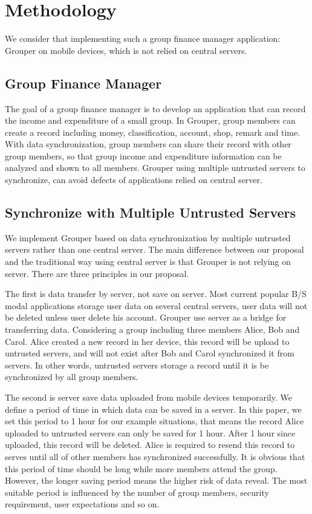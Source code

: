 \documentclass[twocolumn,10pt]{article}
\begin{document}
\section{Methodology}

We consider that implementing such a group finance manager application: Grouper on mobile devices, which is not relied on central servers. 

\subsection{Group Finance Manager}
The goal of a group finance manager is to develop an application that can record the income and expenditure of a small group. In Grouper, group members can create a record including money, classification, account, shop, remark and time. With data synchronization, group members can share their record with other group members, so that group income and expenditure information can be analyzed and shown to all members. Grouper using multiple untrusted servers to synchronize, can avoid defects of applications relied on central server. 

\subsection{Synchronize with Multiple Untrusted Servers}

We implement Grouper based on data synchronization by multiple untrusted servers rather than one central server. The main difference between our proposal and the traditional way using central server is that Grouper is not relying on server. There are three principles in our proposal. 

The first is data transfer by server, not save on server. Most current popular B/S modal applications storage user data on several central servers, user data will not be deleted unless user delete his account. Grouper use server as a bridge for transferring data. Considering a group including three members Alice, Bob and Carol. Alice created a new record in her device, this record will be upload to untrusted servers, and will not exist after Bob and Carol synchronized it from servers. In other words, untrusted servers storage a record until it is be synchronized by all group members.

The second is server save data uploaded from mobile devices temporarily. We define a period of time in which data can be saved in a server. In this paper, we set this period to 1 hour for our example situations, that means the record Alice uploaded to untrusted servers can only be saved for 1 hour. After 1 hour since uploaded, this record will be deleted. Alice is required to resend this record to serves until all of other members has synchronized successfully. It is obvious that this period of time should be long while more members attend the group. However, the longer saving period means the higher risk of data reveal. The most suitable period is influenced by the number of group members, security requirement, user expectations and so on. 
\end{document}
